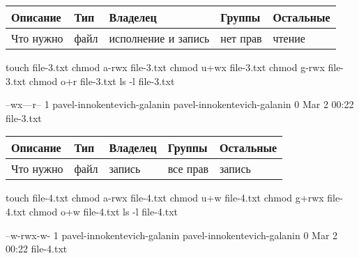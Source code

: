 \begin{table}[h!]
    \centering
    \begin{tabular}{ | l | l | l | l | l | }
        \hline
        Описание            & Тип   & Владелец              & Группы    & Остальные \\ \hline
        \hline
        Что нужно           & файл  & исполнение и запись   & нет прав  & чтение    \\ \hline
    \end{tabular}
\end{table}

\begin{BashBox}
    touch file-3.txt
    chmod a-rwx file-3.txt
    chmod u+wx file-3.txt
    chmod g-rwx file-3.txt
    chmod o+r file-3.txt
    ls -l file-3.txt
\end{BashBox}

\begin{OutBox}
    --wx---r-- 1 pavel-innokentevich-galanin pavel-innokentevich-galanin 0 Mar  2 00:22 file-3.txt
\end{OutBox}

\begin{table}[h!]
    \centering
    \begin{tabular}{ | l | l | l | l | l | }
        \hline
        Описание            & Тип   & Владелец  & Группы    & Остальные \\ \hline
        \hline
        Что нужно           & файл  & запись    & все прав  & запись    \\ \hline
    \end{tabular}
\end{table}

\begin{BashBox}
    touch file-4.txt
    chmod a-rwx file-4.txt
    chmod u+w file-4.txt
    chmod g+rwx file-4.txt
    chmod o+w file-4.txt
    ls -l file-4.txt
\end{BashBox}

\begin{OutBox}
    --w-rwx-w- 1 pavel-innokentevich-galanin pavel-innokentevich-galanin 0 Mar  2 00:22 file-4.txt
\end{OutBox}
